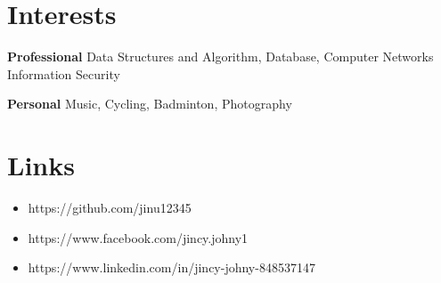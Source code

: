 \documentclass[]{cv-style}          %
\begin{document}
\section{Interests}
\vspace{-0.3cm}
  {}

\begin{entrylist}
\entry
 {\textbf{Professional}}
{}
  {}
  {Data Structures and Algorithm, Database, Computer Networks\\ Information Security }
\end{entrylist}
%
\begin{entrylist}
\entry
 {\textbf{Personal}}
{}
  {}
  {Music, Cycling, Badminton, Photography }

\end{entrylist}
%
\section{Links}
\begin{itemize}
\item https://github.com/jinu12345
\item https://www.facebook.com/jincy.johny1
\item https://www.linkedin.com/in/jincy-johny-848537147
\end{itemize}




%










\end{document}

